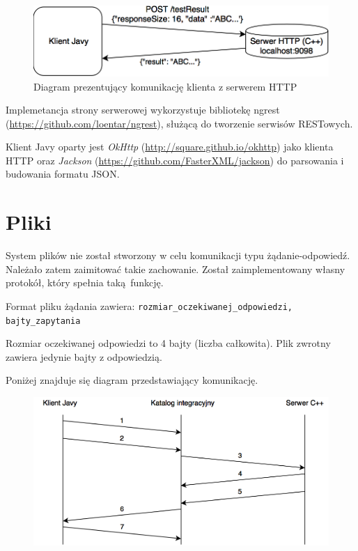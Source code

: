 \begin{figure}[h!]
    \centering
    \includegraphics[width=\textwidth,height=\textheight,keepaspectratio]{img/rest_impl_diagram.png}
    \caption{Diagram prezentujący komunikację klienta z serwerem HTTP}
\end{figure}

Implemetancja strony serwerowej wykorzystuje bibliotekę ngrest (\url{https://github.com/loentar/ngrest}), służącą do tworzenie serwisów RESTowych.

Klient Javy oparty jest \textit{OkHttp} (\url{http://square.github.io/okhttp}) jako klienta HTTP oraz \textit{Jackson} \newline (\url{https://github.com/FasterXML/jackson}) do parsowania i budowania formatu JSON.


\section{Pliki}

System plików nie został stworzony w celu komunikacji typu żądanie-odpowiedź. Należało zatem zaimitować takie zachowanie. Został zaimplementowany własny protokół, który spełnia taką funkcję.

Format pliku żądania zawiera:
\newline
\texttt{rozmiar\_oczekiwanej\_odpowiedzi, bajty\_zapytania}

Rozmiar oczekiwanej odpowiedzi to 4 bajty (liczba całkowita). Plik zwrotny zawiera jedynie bajty z odpowiedzią.

Poniżej znajduje się diagram przedstawiający komunikację.

\begin{figure}[h!]
    \centering
    \includegraphics[width=\textwidth,height=\textheight,keepaspectratio]{img/files_impl_diagram.png}
    \caption{}
\end{figure}

